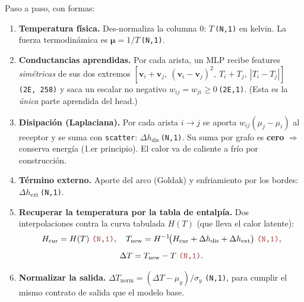 \documentclass[11pt]{article}
\newcommand{\Lw}{\bm{L}_{w}}
\newcommand{\shp}[1]{{\color{shapecol}\texttt{(#1)}}}   %
\theoremstyle{definition}
\begin{document}
\begin{center}
\end{center}

Paso a paso, con formas:
\begin{enumerate}[leftmargin=1.5em]
  \item \textbf{Temperatura física.} Des-normaliza la columna 0:
  $T$\,\shp{N,1} en kelvin. La fuerza termodinámica es $\bm\mu=1/T$\,\shp{N,1}.
  \item \textbf{Conductancias aprendidas.} Por cada arista, un MLP recibe features
  \emph{simétricas} de sus dos extremos
  $[\bm v_i{+}\bm v_j,\ (\bm v_i{-}\bm v_j)^2,\ T_i{+}T_j,\ |T_i{-}T_j|]$
  \shp{2E, 258} y saca un escalar no negativo
  $w_{ij}=w_{ji}\ge0$\,\shp{2E,1}. (Esta es la \emph{única} parte aprendida del head.)
  \item \textbf{Disipación (Laplaciana).} Por cada arista $i{\to}j$ se aporta
  $w_{ij}(\mu_j-\mu_i)$ al receptor y se suma con \texttt{scatter}:
  $\Delta h_{\mathrm{dis}}$\,\shp{N,1}. Su suma por grafo es \textbf{cero}
  $\Rightarrow$ conserva energía (1.er principio). El calor va de caliente a frío
  por construcción.
  \item \textbf{Término externo.} Aporte del arco (Goldak) y enfriamiento por los
  bordes: $\Delta h_{\mathrm{ext}}$\,\shp{N,1}.
  \item \textbf{Recuperar la temperatura por la tabla de entalpía.} Dos
  interpolaciones contra la curva tabulada $H(T)$ (que lleva el calor latente):
  \[
    H_{\text{cur}} = H(T)\ \shp{N,1},\quad
    T_{\text{new}} = H^{-1}\!\big(H_{\text{cur}}+\Delta h_{\mathrm{dis}}+\Delta h_{\mathrm{ext}}\big)\ \shp{N,1},
  \]
  \[
    \Delta T = T_{\text{new}}-T\ \shp{N,1}.
  \]
  \item \textbf{Normalizar la salida.} $\Delta T_{\text{norm}}=(\Delta T-\mu_y)/\sigma_y$
  \shp{N,1}, para cumplir el mismo contrato de salida que el modelo base.
\end{enumerate}
\end{document}
